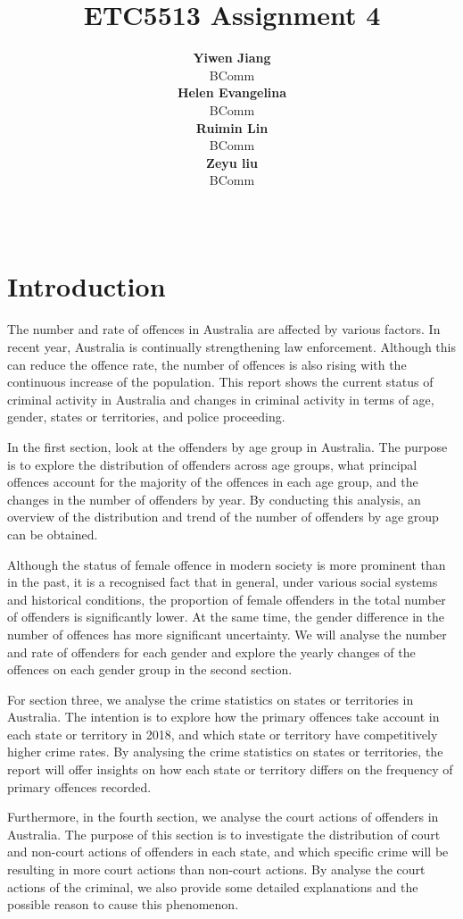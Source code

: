 \documentclass[11pt,a4paper,]{article}
\title{ETC5513 Assignment 4}
\author{\sf\Large\textbf{ Yiwen Jiang}\\ {\sf\large BComm\\[0.5cm]} \sf\Large\textbf{ Helen Evangelina}\\ {\sf\large BComm\\[0.5cm]} \sf\Large\textbf{ Ruimin Lin}\\ {\sf\large BComm\\[0.5cm]} \sf\Large\textbf{ Zeyu liu}\\ {\sf\large BComm\\[0.5cm]}}
\date{\sf\Date~\Month~\Year}
\makeatletter
\def\titlepage{\front{\expandafter{\@title}}{\@author}{\@organization}}
\makeatother
\begin{document}
\titlepage

{
\setcounter{tocdepth}{2}
\tableofcontents
}
\newpage

\hypertarget{introduction}{%
\section{Introduction}\label{introduction}}

The number and rate of offences in Australia are affected by various factors. In recent year, Australia is continually strengthening law enforcement. Although this can reduce the offence rate, the number of offences is also rising with the continuous increase of the population. This report shows the current status of criminal activity in Australia and changes in criminal activity in terms of age, gender, states or territories, and police proceeding.

In the first section, look at the offenders by age group in Australia. The purpose is to explore the distribution of offenders across age groups, what principal offences account for the majority of the offences in each age group, and the changes in the number of offenders by year. By conducting this analysis, an overview of the distribution and trend of the number of offenders by age group can be obtained.

Although the status of female offence in modern society is more prominent than in the past, it is a recognised fact that in general, under various social systems and historical conditions, the proportion of female offenders in the total number of offenders is significantly lower. At the same time, the gender difference in the number of offences has more significant uncertainty. We will analyse the number and rate of offenders for each gender and explore the yearly changes of the offences on each gender group in the second section.

For section three, we analyse the crime statistics on states or territories in Australia. The intention is to explore how the primary offences take account in each state or territory in 2018, and which state or territory have competitively higher crime rates. By analysing the crime statistics on states or territories, the report will offer insights on how each state or territory differs on the frequency of primary offences recorded.

Furthermore, in the fourth section, we analyse the court actions of offenders in Australia. The purpose of this section is to investigate the distribution of court and non-court actions of offenders in each state, and which specific crime will be resulting in more court actions than non-court actions. By analyse the court actions of the criminal, we also provide some detailed explanations and the possible reason to cause this phenomenon.
\end{document}
